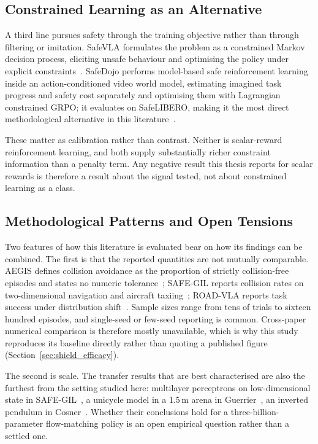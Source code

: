 \documentclass[a4paper,11pt]{report}
\begin{document}
\subsection{Constrained Learning as an Alternative}\label{sec:bg:saferl}

A third line pursues safety through the training objective rather than through filtering or
imitation. SafeVLA formulates the problem as a constrained Markov decision process, eliciting
unsafe behaviour and optimising the policy under explicit constraints~\cite{safevla}. SafeDojo
performs model-based safe reinforcement learning inside an action-conditioned video world model,
estimating imagined task progress and safety cost separately and optimising them with Lagrangian
constrained GRPO; it evaluates on SafeLIBERO, making it the most direct methodological alternative
in this literature~\cite{safedojo}.

These matter as calibration rather than contrast. Neither is scalar-reward reinforcement learning,
and both supply substantially richer constraint information than a penalty term. Any negative
result this thesis reports for scalar rewards is therefore a result about the signal tested, not
about constrained learning as a class.

\subsection{Methodological Patterns and Open Tensions}\label{sec:bg:synthesis}

Two features of how this literature is evaluated bear on how its findings can be combined. The
first is that the reported quantities are not mutually comparable. AEGIS defines collision
avoidance as the proportion of strictly collision-free episodes and states no numeric
tolerance~\cite{vlsa2026}; SAFE-GIL reports collision rates on two-dimensional navigation and
aircraft taxiing~\cite{ciftci2025safegil}; ROAD-VLA reports task success under distribution
shift~\cite{wang2026roadvla}. Sample sizes range from tens of trials to sixteen hundred episodes,
and single-seed or few-seed reporting is common. Cross-paper numerical comparison is therefore
mostly unavailable, which is why this study reproduces its baseline directly rather than quoting a
published figure (Section~\ref{sec:shield_efficacy}).

The second is scale. The transfer results that are best characterised are also the furthest from
the setting studied here: multilayer perceptrons on low-dimensional state in
SAFE-GIL~\cite{ciftci2025safegil}, a unicycle model in a 1.5\,m arena in
Guerrier~\cite{guerrier2025guardrails}, an inverted pendulum in
Cosner~\cite{cosner2022il_cbf}. Whether their conclusions hold for a three-billion-parameter
flow-matching policy is an open empirical question rather than a settled one.
\end{document}
